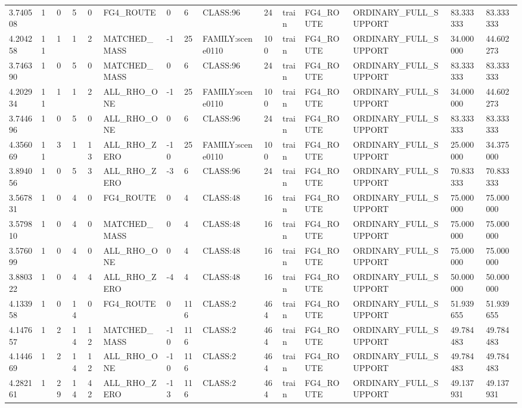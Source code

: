 \begin{tabular}{lllllllllllllll}
3.740508 & 1 & 0 & 5 & 0 & FG4\_ROUTE & 0 & 6 & CLASS:96 & 24 & train & FG4\_ROUTE & ORDINARY\_FULL\_SUPPORT & 83.333333 & 83.333333 \\
4.204258 & 11 & 1 & 1 & 2 & MATCHED\_MASS & -1 & 25 & FAMILY:scene0110 & 100 & train & FG4\_ROUTE & ORDINARY\_FULL\_SUPPORT & 34.000000 & 44.602273 \\
3.746390 & 1 & 0 & 5 & 0 & MATCHED\_MASS & 0 & 6 & CLASS:96 & 24 & train & FG4\_ROUTE & ORDINARY\_FULL\_SUPPORT & 83.333333 & 83.333333 \\
4.202934 & 11 & 1 & 1 & 2 & ALL\_RHO\_ONE & -1 & 25 & FAMILY:scene0110 & 100 & train & FG4\_ROUTE & ORDINARY\_FULL\_SUPPORT & 34.000000 & 44.602273 \\
3.744696 & 1 & 0 & 5 & 0 & ALL\_RHO\_ONE & 0 & 6 & CLASS:96 & 24 & train & FG4\_ROUTE & ORDINARY\_FULL\_SUPPORT & 83.333333 & 83.333333 \\
4.356069 & 11 & 3 & 1 & 13 & ALL\_RHO\_ZERO & -10 & 25 & FAMILY:scene0110 & 100 & train & FG4\_ROUTE & ORDINARY\_FULL\_SUPPORT & 25.000000 & 34.375000 \\
3.894056 & 1 & 0 & 5 & 3 & ALL\_RHO\_ZERO & -3 & 6 & CLASS:96 & 24 & train & FG4\_ROUTE & ORDINARY\_FULL\_SUPPORT & 70.833333 & 70.833333 \\
3.567831 & 1 & 0 & 4 & 0 & FG4\_ROUTE & 0 & 4 & CLASS:48 & 16 & train & FG4\_ROUTE & ORDINARY\_FULL\_SUPPORT & 75.000000 & 75.000000 \\
3.579810 & 1 & 0 & 4 & 0 & MATCHED\_MASS & 0 & 4 & CLASS:48 & 16 & train & FG4\_ROUTE & ORDINARY\_FULL\_SUPPORT & 75.000000 & 75.000000 \\
3.576099 & 1 & 0 & 4 & 0 & ALL\_RHO\_ONE & 0 & 4 & CLASS:48 & 16 & train & FG4\_ROUTE & ORDINARY\_FULL\_SUPPORT & 75.000000 & 75.000000 \\
3.880322 & 1 & 0 & 4 & 4 & ALL\_RHO\_ZERO & -4 & 4 & CLASS:48 & 16 & train & FG4\_ROUTE & ORDINARY\_FULL\_SUPPORT & 50.000000 & 50.000000 \\
4.133958 & 1 & 0 & 14 & 0 & FG4\_ROUTE & 0 & 116 & CLASS:2 & 464 & train & FG4\_ROUTE & ORDINARY\_FULL\_SUPPORT & 51.939655 & 51.939655 \\
4.147657 & 1 & 2 & 14 & 12 & MATCHED\_MASS & -10 & 116 & CLASS:2 & 464 & train & FG4\_ROUTE & ORDINARY\_FULL\_SUPPORT & 49.784483 & 49.784483 \\
4.144669 & 1 & 2 & 14 & 12 & ALL\_RHO\_ONE & -10 & 116 & CLASS:2 & 464 & train & FG4\_ROUTE & ORDINARY\_FULL\_SUPPORT & 49.784483 & 49.784483 \\
4.282161 & 1 & 29 & 14 & 42 & ALL\_RHO\_ZERO & -13 & 116 & CLASS:2 & 464 & train & FG4\_ROUTE & ORDINARY\_FULL\_SUPPORT & 49.137931 & 49.137931 \\

\end{tabular}

